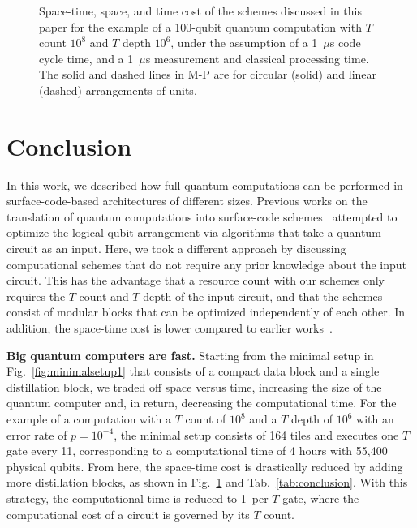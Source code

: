 \documentclass[prx,aps,letterpaper,twocolumn,allowfontchageintitle=true,accepted=2019-02-01]{quantumarticle}
\begin{document}
\begin{figure}[!t]
\centering
\def\svgwidth{\linewidth}

\caption{Space-time, space, and time cost of the schemes discussed in this paper for the example of a 100-qubit quantum computation with $T$ count $10^8$ and $T$ depth $10^6$, under the assumption of a 1~$\mu$s code cycle time, and a 1~$\mu$s measurement and classical processing time. The solid and dashed lines in M-P are for circular (solid) and linear (dashed) arrangements of units.}
\label{fig:stplot}
\end{figure}

\section{Conclusion}
\label{sec:concl}

In this work, we described how full quantum computations can be performed in surface-code-based architectures of different sizes. Previous works on the translation of quantum computations into surface-code schemes~\cite{Paler2016b,Paler2017,Herr2017,Lao2018} attempted to optimize the logical qubit arrangement via algorithms that take a quantum circuit as an input. Here, we took a different approach by discussing computational schemes that do not require any prior knowledge about the input circuit. This has the advantage that a resource count with our schemes only requires the $T$ count and $T$ depth of the input circuit, and that the schemes consist of modular blocks that can be optimized independently of each other. In addition, the space-time cost is lower compared to earlier works~\cite{Fowler2013,Herr2017}.



\textbf{Big quantum computers are fast.} Starting from the minimal setup in Fig.~\ref{fig:minimalsetup1} that consists of a compact data block and a single distillation block, we traded off space versus time, increasing the size of the quantum computer and, in return, decreasing the computational time. For the example of a computation with a $T$ count of $10^8$ and a $T$ depth of $10^6$ with an error rate of $p=10^{-4}$, the minimal setup consists of 164 tiles and executes one $T$ gate every 11\clock, corresponding to a computational time of 4 hours with 55,400 physical qubits. From here, the space-time cost is drastically reduced by adding more distillation blocks, as shown in Fig.~\ref{fig:stplot} and Tab.~\ref{tab:conclusion}. With this strategy, the computational time is reduced to 1\clock \ per $T$ gate, where the computational cost of a circuit is governed by its $T$ count.
\end{document}
